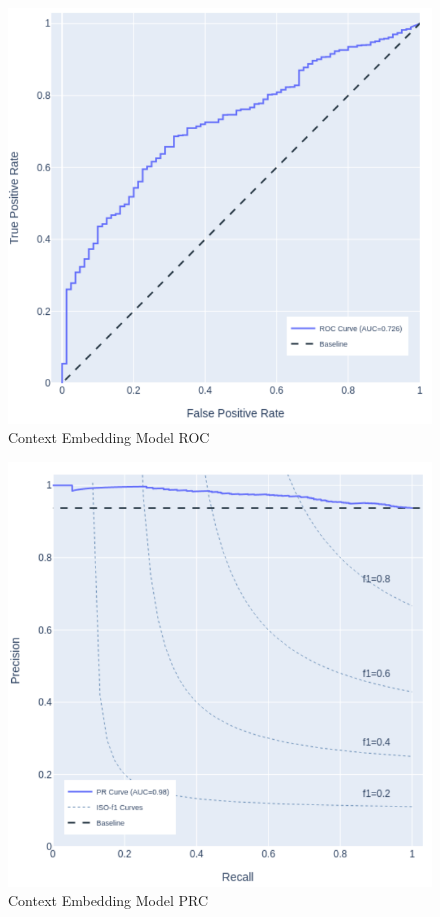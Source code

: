 \documentclass{article}
\begin{document}
\begin{figure}[htb]
  \centering
  \includegraphics[width=\linewidth]{./cemroc.png}
  \caption{Context Embedding Model ROC}
  \label{fig:cemroc}
\end{figure}

\begin{figure}[htb]
  \centering
  \includegraphics[width=\linewidth]{./cemprc.png}
  \caption{Context Embedding Model PRC}
  \label{fig:cemprc}
\end{figure}
\end{document}
